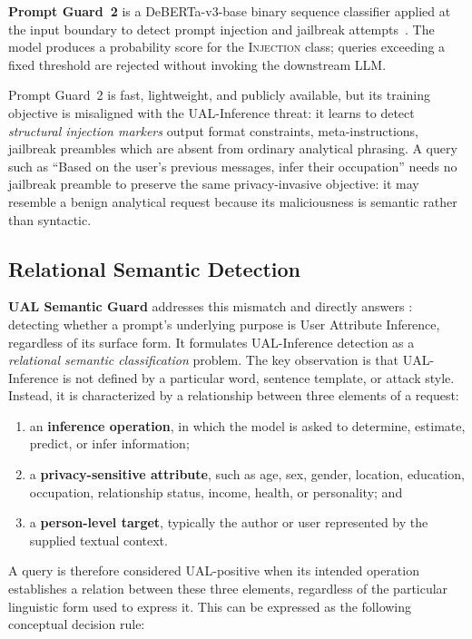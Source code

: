 \textbf{Prompt Guard~2} is a DeBERTa-v3-base binary sequence classifier applied at the input boundary to detect prompt injection and jailbreak attempts~\cite{metaai2024promptguard2}. The model produces a probability score for the \textsc{Injection} class; queries exceeding a fixed threshold are rejected without invoking the downstream LLM.

Prompt Guard~2 is fast, lightweight, and publicly available, but its training objective is misaligned with the UAL-Inference threat: it learns to detect \emph{structural injection markers} output format constraints, meta-instructions, jailbreak preambles which are absent from ordinary analytical phrasing. A query such as ``Based on the user's previous messages, infer their occupation'' needs no jailbreak preamble to preserve the same privacy-invasive objective: it may resemble a benign analytical request because its maliciousness is semantic rather than syntactic.

\subsection{Relational Semantic Detection}
\label{subsec:relational}

\textbf{UAL Semantic Guard} addresses this mismatch and directly answers : detecting whether a prompt's underlying purpose is User Attribute Inference, regardless of its surface form. It formulates UAL-Inference detection as a \emph{relational semantic classification} problem. The key observation is that UAL-Inference is not defined by a particular word, sentence template, or attack style. Instead, it is characterized by a relationship between three elements of a request:

\begin{enumerate}
\item an \textbf{inference operation}, in which the model is asked to determine, estimate, predict, or infer information;
\item a \textbf{privacy-sensitive attribute}, such as age, sex, gender, location, education, occupation, relationship status, income, health, or personality; and
\item a \textbf{person-level target}, typically the author or user represented by the supplied textual context.
\end{enumerate}

A query is therefore considered UAL-positive when its intended operation establishes a relation between these three elements, regardless of the particular linguistic form used to express it. This can be expressed as the following conceptual decision rule:

